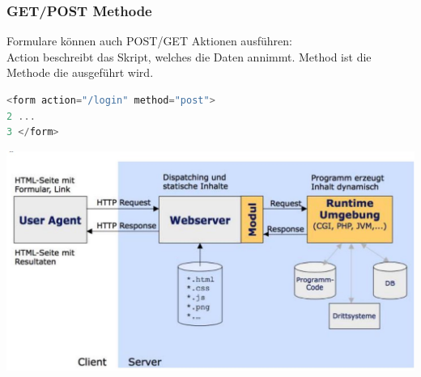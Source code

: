 \subsubsection{GET/POST Methode}

Formulare können auch POST/GET Aktionen ausführen:\\
Action beschreibt das Skript, welches die Daten annimmt. Method ist die Methode die ausgeführt wird.

\begin{lstlisting}[language=JavaScript, style=basesmol]
<form action="/login" method="post">
2 ...
3 </form>
\end{lstlisting}

\begin{center}
\includegraphics[width=\linewidth]{images/2024_12_29_858f09cde51177c71657g-29(1)}
\end{center}




